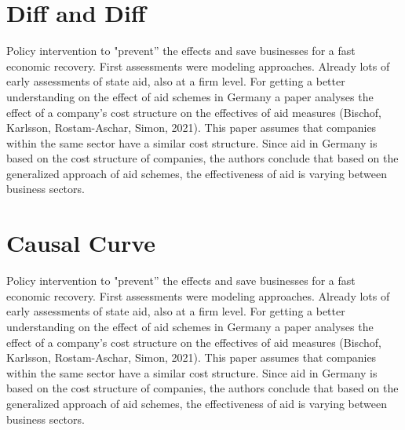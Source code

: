 \section{Diff and Diff}

Policy intervention to "prevent” the effects and save businesses for a fast economic recovery.
First assessments were modeling approaches.
Already lots of early assessments of state aid, also at a firm level.
For getting a better understanding on the effect of aid schemes in Germany a paper analyses the effect of a company’s cost structure on the effectives of aid measures (Bischof, Karlsson, Rostam-Aschar, Simon, 2021). 
This paper assumes that companies within the same sector have a similar cost structure. 
Since aid in Germany is based on the cost structure of companies, the authors conclude that based on the generalized approach of aid schemes, the effectiveness of aid is varying between business sectors.



\section{Causal Curve}

Policy intervention to "prevent” the effects and save businesses for a fast economic recovery.
First assessments were modeling approaches.
Already lots of early assessments of state aid, also at a firm level.
For getting a better understanding on the effect of aid schemes in Germany a paper analyses the effect of a company’s cost structure on the effectives of aid measures (Bischof, Karlsson, Rostam-Aschar, Simon, 2021). 
This paper assumes that companies within the same sector have a similar cost structure. 
Since aid in Germany is based on the cost structure of companies, the authors conclude that based on the generalized approach of aid schemes, the effectiveness of aid is varying between business sectors.